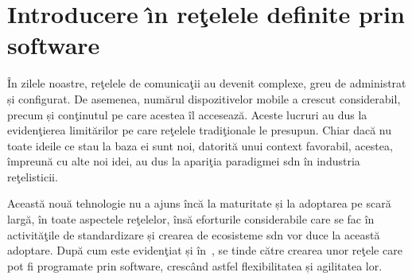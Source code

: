 \chapter{Introducere \^{\i}n reţelele definite prin software\label{ch:introducere_sdn}}

\graphicspath{ {cap-introducere_in_sdn/figures/} }

În zilele noastre, reţelele de comunicaţii au devenit complexe, greu de administrat și configurat. De asemenea, numărul dispozitivelor mobile a crescut considerabil, precum și conţinutul pe care acestea îl accesează. Aceste lucruri au dus la evidenţierea limitărilor pe care reţelele tradiţionale le presupun. Chiar dacă nu toate ideile ce stau la baza ei sunt noi, datorită unui context favorabil, acestea, împreună cu alte noi idei, au dus la apariţia paradigmei \gls{sdn} în industria reţelisticii.

Această nouă tehnologie nu a ajuns încă la maturitate și la adoptarea pe scară largă, în toate aspectele reţelelor, însă eforturile considerabile care se fac în activităţile de standardizare și crearea de ecosisteme \gls{sdn} vor duce la această adoptare. După cum este evidenţiat și în~\cite{nadeau2013sdn}, se tinde către crearea unor reţele care pot fi programate prin software, crescând astfel flexibilitatea și agilitatea lor.




